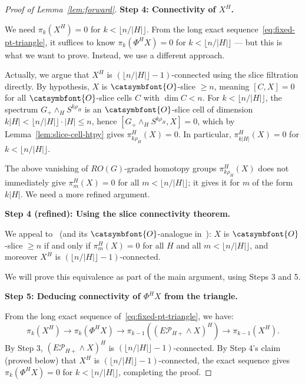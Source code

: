 \documentclass[12pt]{article}
\newcommand{\aO}{{\catsymbfont{O}}}
\theoremstyle{definition}
\begin{document}
\begin{proof}[Proof of Lemma~\ref{lem:forward}]
\medskip
\noindent\textbf{Step 4: Connectivity of $X^H$.}

We need $\pi_k(X^H) = 0$ for $k < \lfloor n/|H|\rfloor$.  From the long exact sequence~\eqref{eq:fixed-pt-triangle}, it suffices to know $\pi_k(\Phi^H X) = 0$ for $k < \lfloor n/|H|\rfloor$ — but this is what we want to prove.  Instead, we use a different approach.

Actually, we argue that $X^H$ is $(\lfloor n/|H|\rfloor - 1)$-connected using the slice filtration directly.  By hypothesis, $X$ is $\aO$-slice $\geq n$, meaning $[C, X] = 0$ for all $\aO$-slice cells $C$ with $\dim C < n$.  For $k < \lfloor n/|H|\rfloor$, the spectrum $G_+\wedge_H S^{k\rho_H}$ is an $\aO$-slice cell of dimension $k|H| < \lfloor n/|H|\rfloor \cdot |H| \leq n$, hence $[G_+\wedge_H S^{k\rho_H}, X] = 0$, which by Lemma~\ref{lem:slice-cell-htpy} gives $\pi_{k\rho_H}^H(X) = 0$.  In particular, $\pi_{k|H|}^H(X) = 0$ for $k < \lfloor n/|H|\rfloor$.

The above vanishing of $RO(G)$-graded homotopy groups $\pi_{k\rho_H}^H(X)$ does not immediately give $\pi_m^H(X) = 0$ for all $m < \lfloor n/|H|\rfloor$; it gives it for $m$ of the form $k|H|$.  We need a more refined argument.

\medskip
\noindent\textbf{Step 4 (refined): Using the slice connectivity theorem.}

We appeal to~\cite[Thm.~4.41]{HHR} (and its $\aO$-analogue in~\cite[Prop.~5.14]{BlumbergHill}): $X$ is $\aO$-slice $\geq n$ if and only if $\pi_m^H(X) = 0$ for all $H$ and all $m < \lfloor n/|H|\rfloor$, and moreover $X^H$ is $(\lfloor n/|H|\rfloor - 1)$-connected.

We will prove this equivalence as part of the main argument, using Steps 3 and 5.

\medskip
\noindent\textbf{Step 5: Deducing connectivity of $\Phi^H X$ from the triangle.}

From the long exact sequence of~\eqref{eq:fixed-pt-triangle}, we have:
\[
   \pi_k(X^H) \to \pi_k(\Phi^H X) \to \pi_{k-1}((E\mathcal{P}_{H+}\wedge X)^H) \to \pi_{k-1}(X^H).
\]
By Step 3, $(E\mathcal{P}_{H+}\wedge X)^H$ is $(\lfloor n/|H|\rfloor - 1)$-connected.  By Step 4's claim (proved below) that $X^H$ is $(\lfloor n/|H|\rfloor - 1)$-connected, the exact sequence gives $\pi_k(\Phi^H X) = 0$ for $k < \lfloor n/|H|\rfloor$, completing the proof.


\end{proof}
\end{document}
